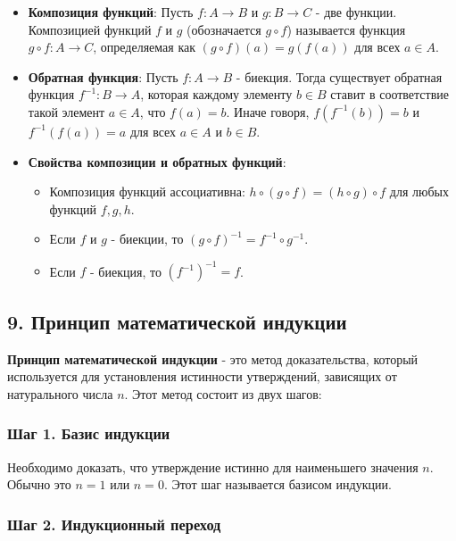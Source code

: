 \documentclass{article}
\begin{document}
\begin{itemize}
    \item \textbf{Композиция функций}: Пусть \( f: A \to B \) и \( g: B \to C \) - две функции. Композицией функций \( f \) и \( g \) (обозначается \( g \circ f \)) называется функция \( g \circ f: A \to C \), определяемая как \( (g \circ f)(a) = g(f(a)) \) для всех \( a \in A \).
    
    \item \textbf{Обратная функция}: Пусть \( f: A \to B \) - биекция. Тогда существует обратная функция \( f^{-1}: B \to A \), которая каждому элементу \( b \in B \) ставит в соответствие такой элемент \( a \in A \), что \( f(a) = b \). Иначе говоря, \( f(f^{-1}(b)) = b \) и \( f^{-1}(f(a)) = a \) для всех \( a \in A \) и \( b \in B \).
    
    \item \textbf{Свойства композиции и обратных функций}:
    \begin{itemize}
        \item Композиция функций ассоциативна: \( h \circ (g \circ f) = (h \circ g) \circ f \) для любых функций \( f, g, h \).
        \item Если \( f \) и \( g \) - биекции, то \( (g \circ f)^{-1} = f^{-1} \circ g^{-1} \).
        \item Если \( f \) - биекция, то \( (f^{-1})^{-1} = f \).
    \end{itemize}
\end{itemize}

\pagebreak

\subsection*{9. Принцип математической индукции}

\textbf{Принцип математической индукции} - это метод доказательства, который используется для установления истинности утверждений, зависящих от натурального числа \( n \). Этот метод состоит из двух шагов:

\subsubsection*{Шаг 1. Базис индукции}

Необходимо доказать, что утверждение истинно для наименьшего значения \( n \). Обычно это \( n = 1 \) или \( n = 0 \). Этот шаг называется базисом индукции.

\subsubsection*{Шаг 2. Индукционный переход}
\end{document}
